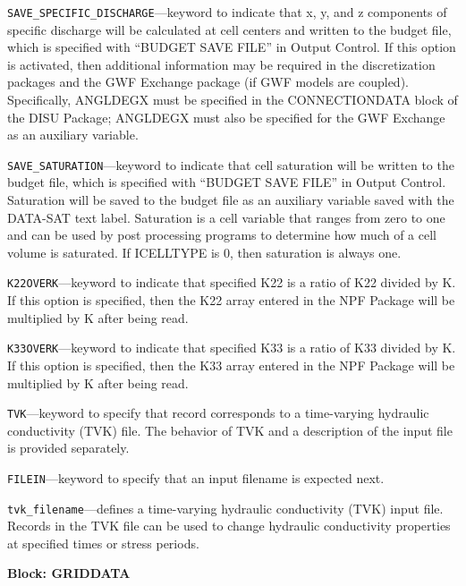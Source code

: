 \begin{description}
\item \texttt{SAVE\_SPECIFIC\_DISCHARGE}---keyword to indicate that x, y, and z components of specific discharge will be calculated at cell centers and written to the budget file, which is specified with ``BUDGET SAVE FILE'' in Output Control.  If this option is activated, then additional information may be required in the discretization packages and the GWF Exchange package (if GWF models are coupled).  Specifically, ANGLDEGX must be specified in the CONNECTIONDATA block of the DISU Package; ANGLDEGX must also be specified for the GWF Exchange as an auxiliary variable.

\item \texttt{SAVE\_SATURATION}---keyword to indicate that cell saturation will be written to the budget file, which is specified with ``BUDGET SAVE FILE'' in Output Control.  Saturation will be saved to the budget file as an auxiliary variable saved with the DATA-SAT text label.  Saturation is a cell variable that ranges from zero to one and can be used by post processing programs to determine how much of a cell volume is saturated.  If ICELLTYPE is 0, then saturation is always one.

\item \texttt{K22OVERK}---keyword to indicate that specified K22 is a ratio of K22 divided by K.  If this option is specified, then the K22 array entered in the NPF Package will be multiplied by K after being read.

\item \texttt{K33OVERK}---keyword to indicate that specified K33 is a ratio of K33 divided by K.  If this option is specified, then the K33 array entered in the NPF Package will be multiplied by K after being read.

\item \texttt{TVK}---keyword to specify that record corresponds to a time-varying hydraulic conductivity (TVK) file.  The behavior of TVK and a description of the input file is provided separately.

\item \texttt{FILEIN}---keyword to specify that an input filename is expected next.

\item \texttt{tvk\_filename}---defines a time-varying hydraulic conductivity (TVK) input file.  Records in the TVK file can be used to change hydraulic conductivity properties at specified times or stress periods.

\end{description}
\item \textbf{Block: GRIDDATA}

